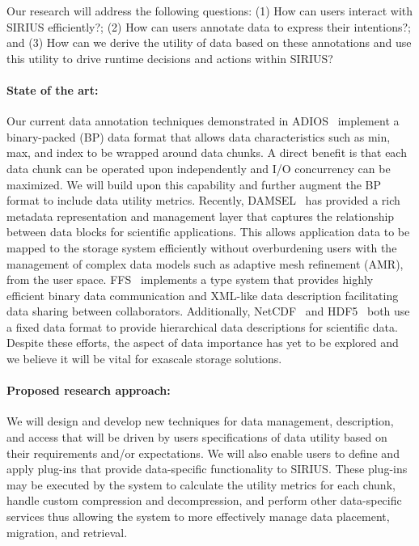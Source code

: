

Our research will address the following questions:
(1) How can users interact with SIRIUS  efficiently?;
(2) How can users annotate data to express their intentions?; and
(3) How can we derive the utility of data based on these annotations and use this utility to drive runtime decisions and actions within SIRIUS?

\paragraph{State of the art:}
Our current data annotation techniques demonstrated in
ADIOS~\cite{lofstead:2009:adaptible} implement a binary-packed (BP) data format that
allows data characteristics such as min, max, and index to be wrapped around
data chunks. A direct benefit is that each data chunk can be operated upon
independently and I/O concurrency can be maximized. We will build upon this
capability and further augment the BP format to include data utility metrics.
Recently,
DAMSEL~\cite{damsel} has provided a rich metadata representation and management
layer that captures the relationship between data blocks for scientific
applications.  This allows application data to be mapped to the storage system
efficiently without overburdening users with the management of complex data models such
as adaptive mesh refinement (AMR), from the user space. 
FFS~\cite{ffs} implements a type system that provides highly efficient binary
data communication and XML-like data description facilitating data sharing
between collaborators. Additionally, NetCDF~\cite{netcdf} and HDF5~\cite{hdf5}
both use a fixed data format to provide hierarchical data descriptions for scientific data.
Despite these efforts, the aspect of data importance has yet to be 
explored and we believe it will be vital for exascale storage solutions.

\paragraph{Proposed research approach:} 
We will design and develop new techniques for data management, description,
and access that will be driven by users specifications of data utility based on their requirements and/or
expectations. We will also enable users to define and apply plug-ins that
provide data-specific functionality to SIRIUS.
These plug-ins may be executed by the system to
calculate the utility metrics for each chunk, handle custom compression
and decompression, and perform other data-specific services thus allowing
the system to more effectively manage data placement, migration, and retrieval.
%

